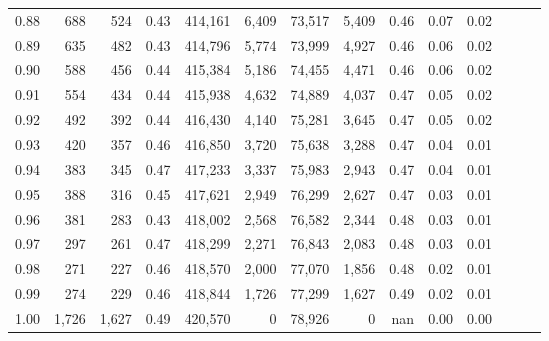\begin{tabular}{rrrrrrrrrrrrrr}
0.88 &     688 &    524 &  0.43 &  414,161 &    6,409 &  73,517 &   5,409 &  0.46 &  0.07 &      0.02 \\
0.89 &     635 &    482 &  0.43 &  414,796 &    5,774 &  73,999 &   4,927 &  0.46 &  0.06 &      0.02 \\
0.90 &     588 &    456 &  0.44 &  415,384 &    5,186 &  74,455 &   4,471 &  0.46 &  0.06 &      0.02 \\
0.91 &     554 &    434 &  0.44 &  415,938 &    4,632 &  74,889 &   4,037 &  0.47 &  0.05 &      0.02 \\
0.92 &     492 &    392 &  0.44 &  416,430 &    4,140 &  75,281 &   3,645 &  0.47 &  0.05 &      0.02 \\
0.93 &     420 &    357 &  0.46 &  416,850 &    3,720 &  75,638 &   3,288 &  0.47 &  0.04 &      0.01 \\
0.94 &     383 &    345 &  0.47 &  417,233 &    3,337 &  75,983 &   2,943 &  0.47 &  0.04 &      0.01 \\
0.95 &     388 &    316 &  0.45 &  417,621 &    2,949 &  76,299 &   2,627 &  0.47 &  0.03 &      0.01 \\
0.96 &     381 &    283 &  0.43 &  418,002 &    2,568 &  76,582 &   2,344 &  0.48 &  0.03 &      0.01 \\
0.97 &     297 &    261 &  0.47 &  418,299 &    2,271 &  76,843 &   2,083 &  0.48 &  0.03 &      0.01 \\
0.98 &     271 &    227 &  0.46 &  418,570 &    2,000 &  77,070 &   1,856 &  0.48 &  0.02 &      0.01 \\
0.99 &     274 &    229 &  0.46 &  418,844 &    1,726 &  77,299 &   1,627 &  0.49 &  0.02 &      0.01 \\
1.00 &   1,726 &  1,627 &  0.49 &  420,570 &        0 &  78,926 &       0 &   nan &  0.00 &      0.00 \\
\bottomrule
\end{tabular}
